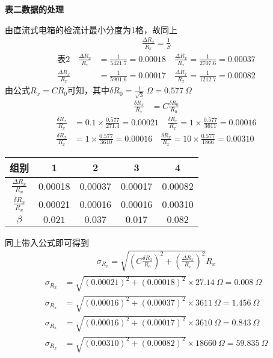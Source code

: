 \documentclass[UTF8]{ctexart}
\begin{document}
\textbf{表二数据的处理}

由直流式电箱的检流计最小分度为1格，故同上
\begin{align*}
    \frac{\Delta R_x}{R_x} = \frac{1}{S} 
\end{align*}
\begin{align*}
 \text{表2} \quad  \frac{\Delta R_x}{R_x} &= \frac{1}{5421.7} = 0.00018 \quad \frac{\Delta R_x}{R_x} = \frac{1}{2707.6} = 0.00037\\
 \frac{\Delta R_x}{R_x} &= \frac{1}{5901.6} = 0.00017 \quad \frac{\Delta R_x}{R_x} = \frac{1}{1212.7} = 0.00082 
\end{align*}
由公式$R_x = CR_0$可知，其中$\delta R_0 = \frac{1}{\sqrt{3}} \ \Omega = 0.577 \ \Omega$
\begin{align*}
    \frac{\delta R_x}{R_x} &= C\frac{\delta R_0}{R_0} 
\end{align*}
\begin{align*}
     \frac{\delta R_x}{R_x} &= 0.1 \times \frac{0.577}{271.4} =  0.00021 \quad
    \frac{\delta R_x}{R_x} = 1 \times \frac{0.577}{3611} = 0.00016 \\
    \frac{\delta R_x}{R_x} &= 1 \times \frac{0.577}{3610} = 0.00016 \quad
    \frac{\delta R_x}{R_x} = 10 \times \frac{0.577}{1866} = 0.00310
\end{align*}
\begin{table}[H]
    \centering
    \begin{tabular}{|c|c|c|c|c|}
    \hline
        组别 &  1 & 2 & 3 & 4   \\
    \hline
       $\frac{\Delta R_x}{R_x}$  & 0.00018 & 0.00037 & 0.00017 & 0.00082  \\
    \hline
       $\frac{\delta R_x}{R_x}$ & 0.00021  & 0.00016 & 0.00016 & 0.00310 \\
    \hline
       $\beta$ &   $0.021$ &   $0.037$  &  $0.017$  & $0.082$ \\
    \hline
    \end{tabular}
\end{table}
同上带入公式即可得到
\begin{align*}
    \sigma_{R_x} =  \sqrt{\left( C\frac{\delta R_0}{R_0}\right)^2 +
     \left( \frac{\Delta R_x}{R_x}\right)^2} R_x
\end{align*}
\begin{align*}
     \sigma_{R_x} &= \sqrt{\left(0.00021\right)^2 +
     \left( 0.00018\right)^2} \times 27.14 \ \Omega =0.008 \ \Omega \\
     \sigma_{R_x} &= \sqrt{\left(0.00016\right)^2 + 
     \left( 0.00037\right)^2} \times 3611 \ \Omega = 1.456\ \Omega \\
     \sigma_{R_x} &= \sqrt{\left(0.00016\right)^2 +
     \left( 0.00017\right)^2} \times 3610\ \Omega = 0.843 \ \Omega \\
     \sigma_{R_x} &= \sqrt{\left(0.00310\right)^2 +
     \left( 0.00082\right)^2} \times 18660 \ \Omega = 59.835 \ \Omega 
\end{align*}
\end{document}
